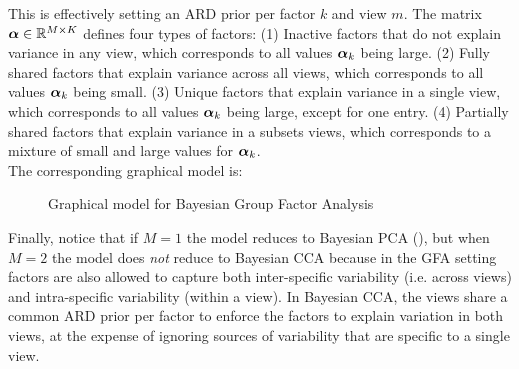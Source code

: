 This is effectively setting an ARD prior per factor $k$ and view $m$. The matrix $\mbox{\boldmath $\alpha$} \in \mathbb{R}^{M \times K}$ defines four types of factors: (1) Inactive factors that do not explain variance in any view, which corresponds to all values $\mbox{\boldmath $\alpha$}_k$ being large. (2) Fully shared factors that explain variance across all views, which corresponds to all values $\mbox{\boldmath $\alpha$}_k$ being small. (3) Unique factors that explain variance in a single view, which corresponds to all values $\mbox{\boldmath $\alpha$}_k$ being large, except for one entry. (4) Partially shared factors that explain variance in a subsets views, which corresponds to a mixture of small and large values for $\mbox{\boldmath $\alpha$}_k$.\\

The corresponding graphical model is:

\begin{figure}[H] \begin{center}
	
	\label{fig:graphical_GFA}
	\caption{Graphical model for Bayesian Group Factor Analysis}
\end{center} \end{figure}


Finally, notice that if $M=1$ the model reduces to Bayesian PCA (), but when $M=2$ the model does \textit{not} reduce to Bayesian CCA because in the GFA setting factors are also allowed to capture both inter-specific variability (i.e. across views) and intra-specific variability (within a view). In Bayesian CCA, the views share a common ARD prior per factor to enforce the factors to explain variation in both views, at the expense of ignoring sources of variability that are specific to a single view.
